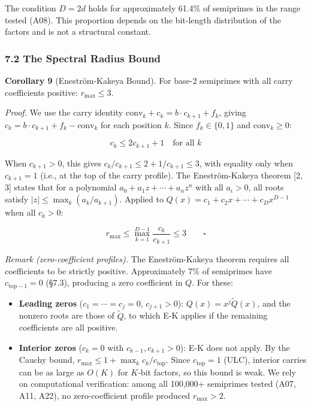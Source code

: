 \documentclass[
  11pt,
]{article}
\providecommand{\tightlist}{%
  \setlength{\itemsep}{0pt}\setlength{\parskip}{0pt}}
\begin{document}
The condition \(D = 2d\) holds for approximately 61.4\% of semiprimes in the
range tested (A08). This proportion depends on the bit-length distribution of
the factors and is not a structural constant.

\subsubsection{7.2 The Spectral Radius Bound}\label{the-spectral-radius-bound}

\textbf{Corollary 9} (Eneström-Kakeya Bound). For base-2 semiprimes with all
carry coefficients positive: \(r_{\max} \leq 3\).

\emph{Proof.} We use the carry identity
\(\text{conv}_k + c_k = b \cdot c_{k+1} + f_k\), giving
\(c_k = b \cdot c_{k+1} + f_k - \text{conv}_k\) for each position \(k\). Since
\(f_k \in \lbrace{}0, 1\rbrace{}\) and \(\text{conv}_k \geq 0\):

\[c_k \leq 2 c_{k+1} + 1 \quad \text{for all } k\]

When \(c_{k+1} > 0\), this gives \(c_k / c_{k+1} \leq 2 + 1/c_{k+1} \leq 3\),
with equality only when \(c_{k+1} = 1\) (i.e., at the top of the carry profile).
The Eneström-Kakeya theorem {[}2, 3{]} states that for a polynomial
\(a_0 + a_1 z + \cdots + a_n z^n\) with all \(a_i > 0\), all roots satisfy
\(|z| \leq \max_k(a_k / a_{k+1})\). Applied to
\(Q(x) = c_1 + c_2 x + \cdots + c_D x^{D-1}\) when all \(c_k > 0\):

\[r_{\max} \leq \max_{k=1}^{D-1}\frac{c_k}{c_{k+1}} \leq 3 \qquad \square\]

\emph{Remark (zero-coefficient profiles).} The Eneström-Kakeya theorem requires
all coefficients to be strictly positive. Approximately 7\% of semiprimes have
\(c_{\text{top}-1} = 0\) (§7.3), producing a zero coefficient in \(Q\). For
these:

\begin{itemize}
\tightlist
\item
  \textbf{Leading zeros} (\(c_1 = \cdots = c_j = 0\), \(c_{j+1} > 0\)):
  \(Q(x) = x^j \tilde{Q}(x)\), and the nonzero roots are those of \(\tilde{Q}\),
  to which E-K applies if the remaining coefficients are all positive.
\item
  \textbf{Interior zeros} (\(c_k = 0\) with \(c_{k-1}, c_{k+1} > 0\)): E-K does
  not apply. By the Cauchy bound,
  \(r_{\max} \leq 1 + \max_k c_k / c_{\text{top}}\). Since
  \(c_{\text{top}} = 1\) (ULC), interior carries can be as large as \(O(K)\) for
  \(K\)-bit factors, so this bound is weak. We rely on computational
  verification: among all 100,000+ semiprimes tested (A07, A11, A22), no
  zero-coefficient profile produced \(r_{\max} > 2\).
\end{itemize}
\end{document}

